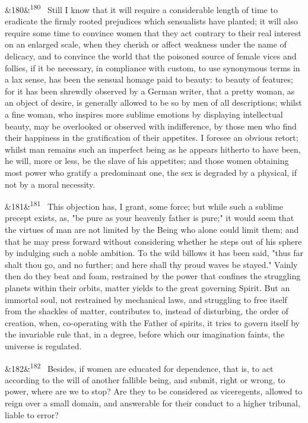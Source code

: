 \documentclass[12pt]{article}
\newcommand{\para}[1][]{\par\noindent\ifx&#1&\else\textsuperscript{\footnotesize #1}~\fi}
\begin{document}
\para[180] Still I know that it will require a considerable length of time to eradicate the firmly rooted prejudices which sensualists have planted; it will also require some time to convince women that they act contrary to their real interest on an enlarged scale, when they cherish or affect weakness under the name of delicacy, and to convince the world that the poisoned source of female vices and follies, if it be necessary, in compliance with custom, to use synonymous terms in a lax sense, has been the sensual homage paid to beauty: to beauty of features; for it has been shrewdly observed by a German writer, that a pretty woman, as an object of desire, is generally allowed to be so by men of all descriptions; whilst a fine woman, who inspires more sublime emotions by displaying intellectual beauty, may be overlooked or observed with indifference, by those men who find their happiness in the gratification of their appetites. I foresee an obvious retort; whilst man remains such an imperfect being as he appears hitherto to have been, he will, more or less, be the slave of his appetites; and those women obtaining most power who gratify a predominant one, the sex is degraded by a physical, if not by a moral necessity.

\para[181] This objection has, I grant, some force; but while such a sublime precept exists, as, "be pure as your heavenly father is pure;" it would seem that the virtues of man are not limited by the Being who alone could limit them; and that he may press forward without considering whether he steps out of his sphere by indulging such a noble ambition. To the wild billows it has been said, "thus far shalt thou go, and no further; and here shall thy proud waves be stayed." Vainly then do they beat and foam, restrained by the power that confines the struggling planets within their orbits, matter yields to the great governing Spirit. But an immortal soul, not restrained by mechanical laws, and struggling to free itself from the shackles of matter, contributes to, instead of disturbing, the order of creation, when, co-operating with the Father of spirits, it tries to govern itself by the invariable rule that, in a degree, before which our imagination faints, the universe is regulated.

\para[182] Besides, if women are educated for dependence, that is, to act according to the will of another fallible being, and submit, right or wrong, to power, where are we to stop? Are they to be considered as viceregents, allowed to reign over a small domain, and answerable for their conduct to a higher tribunal, liable to error?
\end{document}

